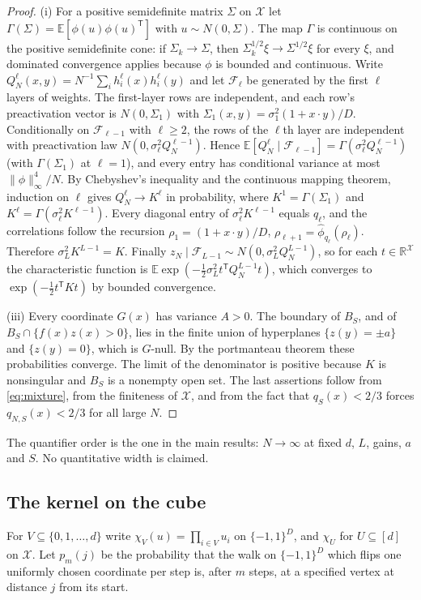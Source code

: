 \documentclass[11pt]{article}
\theoremstyle{definition}\newtheorem{assumption}[theorem]{Assumption}
\theoremstyle{remark}\newtheorem{remark}[theorem]{Remark}
\newcommand{\E}{\mathbb E}
\newcommand{\X}{\mathcal X}
\newcommand{\R}{\mathbb R}
\begin{document}
\begin{proof}
(i) For a positive semidefinite matrix $\Sigma$ on $\X$ let
$\Gamma(\Sigma)=\E[\phi(u)\phi(u)^{\mathsf T}]$ with $u\sim N(0,\Sigma)$.
The map $\Gamma$ is continuous on the positive semidefinite cone: if
$\Sigma_k\to\Sigma$, then $\Sigma_k^{1/2}\xi\to\Sigma^{1/2}\xi$ for every
$\xi$, and dominated convergence applies because $\phi$ is bounded and
continuous. Write $Q^\ell_N(x,y)=N^{-1}\sum_ih^\ell_i(x)h^\ell_i(y)$ and
let $\mathcal F_\ell$ be generated by the first $\ell$ layers of weights.
The first-layer rows are independent, and each row's preactivation vector
is $N(0,\Sigma_1)$ with $\Sigma_1(x,y)=\sigma_1^2(1+x\cdot y)/D$.
Conditionally on $\mathcal F_{\ell-1}$ with $\ell\ge2$, the rows of the
$\ell$th layer are independent with preactivation law
$N(0,\sigma_\ell^2Q^{\ell-1}_N)$. Hence
$\E[Q^\ell_N\mid\mathcal F_{\ell-1}]=\Gamma(\sigma_\ell^2Q^{\ell-1}_N)$
(with $\Gamma(\Sigma_1)$ at $\ell=1$), and every entry has conditional
variance at most $\|\phi\|_\infty^4/N$. By Chebyshev's inequality and the
continuous mapping theorem, induction on $\ell$ gives
$Q^\ell_N\to K^\ell$ in probability, where $K^1=\Gamma(\Sigma_1)$ and
$K^\ell=\Gamma(\sigma_\ell^2K^{\ell-1})$. Every diagonal entry of
$\sigma_\ell^2K^{\ell-1}$ equals $q_\ell$, and the correlations follow
the recursion $\rho_1=(1+x\cdot y)/D$, $\rho_{\ell+1}=\widehat\phi_{q_\ell}
(\rho_\ell)$. Therefore $\sigma_L^2K^{L-1}=K$. Finally
$z_N\mid\mathcal F_{L-1}\sim N(0,\sigma_L^2Q^{L-1}_N)$, so for each
$t\in\R^\X$ the characteristic function is
$\E\exp(-\tfrac12\sigma_L^2t^{\mathsf T}Q^{L-1}_Nt)$, which converges to
$\exp(-\tfrac12t^{\mathsf T}Kt)$ by bounded convergence.

(iii) Every coordinate $G(x)$ has variance $A>0$. The boundary of
$B_S$, and of $B_S\cap\{f(x)z(x)>0\}$, lies in the finite union of
hyperplanes $\{z(y)=\pm a\}$ and $\{z(y)=0\}$, which is $G$-null. By the
portmanteau theorem these probabilities converge. The limit of the
denominator is positive because $K$ is nonsingular and $B_S$ is a nonempty
open set. The last assertions follow from \eqref{eq:mixture}, from the
finiteness of $\X$, and from the fact that $q_S(x)<2/3$ forces
$q_{N,S}(x)<2/3$ for all large $N$.
\end{proof}

The quantifier order is the one in the main results: $N\to\infty$ at fixed
$d$, $L$, gains, $a$ and $S$. No quantitative width is claimed.

\subsection{The kernel on the cube}
For $V\subseteq\{0,1,\ldots,d\}$ write $\chi_V(u)=\prod_{i\in V}u_i$ on
$\{-1,1\}^D$, and $\chi_U$ for $U\subseteq[d]$ on $\X$. Let $p_m(j)$ be
the probability that the walk on $\{-1,1\}^D$ which flips one uniformly
chosen coordinate per step is, after $m$ steps, at a specified vertex at
distance $j$ from its start.
\end{document}
